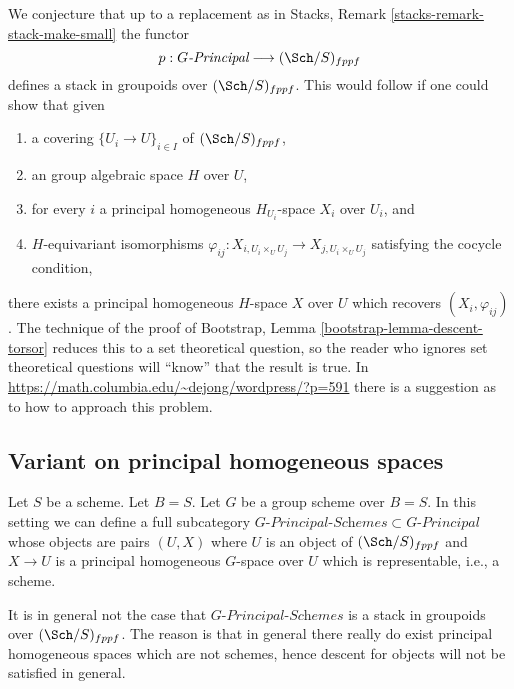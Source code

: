 \begin{remark}
\label{remark-principal-stack-in-groupoids}
We conjecture that up to a replacement as in
Stacks, Remark \ref{stacks-remark-stack-make-small}
the functor
$$
p : G\textit{-Principal} \longrightarrow (\Sch/S)_{fppf}
$$
defines a stack in groupoids over $(\Sch/S)_{fppf}$. This would
follow if one could show that given
\begin{enumerate}
\item a covering $\{U_i \to U\}_{i \in I}$ of $(\Sch/S)_{fppf}$,
\item an group algebraic space $H$ over $U$,
\item for every $i$ a principal homogeneous $H_{U_i}$-space $X_i$
over $U_i$, and
\item $H$-equivariant isomorphisms
$\varphi_{ij} : X_{i, U_i \times_U U_j} \to X_{j, U_i \times_U U_j}$
satisfying the cocycle condition,
\end{enumerate}
there exists a principal homogeneous $H$-space $X$ over $U$
which recovers $(X_i, \varphi_{ij})$. The technique of the proof of
Bootstrap, Lemma \ref{bootstrap-lemma-descent-torsor}
reduces this to a set theoretical question, so the reader who ignores
set theoretical questions will ``know'' that the result is true. In
\url{https://math.columbia.edu/~dejong/wordpress/?p=591}
there is a suggestion as to how to approach this problem.
\end{remark}



\subsection{Variant on principal homogeneous spaces}
\label{subsection-variant-principal-homogeneous-spaces}

\noindent
Let $S$ be a scheme. Let $B = S$.
Let $G$ be a group scheme over $B = S$.
In this setting we can define a full subcategory
$G\textit{-Principal-Schemes} \subset G\textit{-Principal}$
whose objects are pairs $(U, X)$ where $U$ is an object of
$(\Sch/S)_{fppf}$ and $X \to U$ is a principal homogeneous
$G$-space over $U$ which is representable, i.e., a scheme.

\medskip\noindent
It is in general not the case that $G\textit{-Principal-Schemes}$ is
a stack in groupoids over $(\Sch/S)_{fppf}$. The reason is
that in general there really do exist principal homogeneous spaces
which are not schemes, hence descent for objects will not be satisfied
in general.



